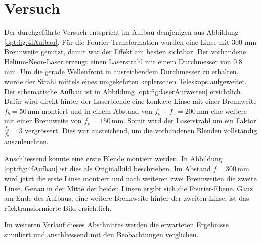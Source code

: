 %
%
%
%
\section{Versuch
  \label{opt:section:versuch}}

Der durchgeführte Versuch entspricht im Aufbau demjenigen aus Abbildung \ref{opt:fig:4fAufbau}.
Für die Fourier-Transformation wurden eine Linse mit 300 mm Brennweite genutzt, damit war der Effekt am besten sichtbar.
Der vorhandene Helium-Neon-Laser erzeugt einen Laserstrahl mit einem Durchmesser von $0.8$ mm.
%
%
Um die gerade Wellenfront in ausreichendem Durchmesser zu erhalten, wurde der Strahl mittels eines umgekehrten keplerschen Teleskops aufgeweitet.
%
%
Der schematische Aufbau ist in Abbildung \ref{opt:fig:laserAufweiten} ersichtlich.
Dafür wird direkt hinter der Laserblende eine konkave Linse mit einer Brennweite $f_b = 50\,\text{mm}$ montiert 
und in einem Abstand von $f_b + f_o = 200\,\text{mm}$ eine weitere mit einer Brennweite von $f_o = 150\,\text{mm}$.
Somit wird der Laserstrahl um ein Faktor $\frac{f_o}{f_b} = 3$ vergrössert.
Dies war ausreichend, um die vorhandenen Blenden vollständig auszuleuchten.

Anschliessend konnte eine erste Blende montiert werden.
In Abbildung \ref{opt:fig:4fAufbau} ist dies als Originalbild beschrieben.
Im Abstand $f=300\,\text{mm}$ wird jetzt die erste Linse montiert und nach weiteren zwei Brennweiten die zweite Linse.
Genau in der Mitte der beiden Linsen ergibt sich die Fourier-Ebene.
Ganz am Ende des Aufbaus, eine weitere Brennweite hinter der zweiten Linse, ist das rücktransformierte Bild ersichtlich.

Im weiteren Verlauf dieses Abschnittes werden die erwarteten Ergebnisse simuliert und anschliessend mit den Beobachtungen verglichen.

